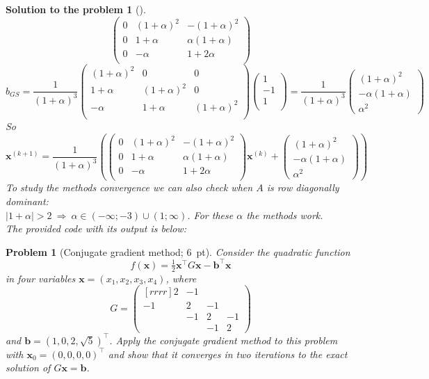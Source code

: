 \documentclass[12pt,a4]{article}
\newtheorem{problem}{Problem}
\newtheorem{solution}{Solution to the problem}
\newcommand{\bb}{{\mathbf b}}
\newcommand{\bx}{{\mathbf x}}
\begin{document}
\begin{solution}[]
\[\begin{pmatrix}
0 & (1+\alpha)^2 & -(1+\alpha)^2\\
0 & 1+\alpha & \alpha(1+\alpha)\\
0 & -\alpha & 1+2\alpha\\
\end{pmatrix}
\]
\[
b_{GS}
= \frac{1}{(1+\alpha)^3}
\begin{pmatrix}
(1+\alpha)^2 & 0 & 0\\
1+\alpha     & (1+\alpha)^2 & 0\\
-\alpha      & 1+\alpha & (1+\alpha)^2\\
\end{pmatrix}
\begin{pmatrix} 1 \\ -1\\ 1 \\ \end{pmatrix}
=
\frac{1}{(1+\alpha)^3}
\begin{pmatrix} (1+\alpha)^2 \\ -\alpha(1+\alpha)\\ \alpha^2 \end{pmatrix}
\]
So
\[
\bx^{(k+1)}=\frac{1}{(1+\alpha)^3}\left(
\begin{pmatrix}
0 & (1+\alpha)^2 & -(1+\alpha)^2\\
0 & 1+\alpha & \alpha(1+\alpha)\\
0 & -\alpha & 1+2\alpha\\
\end{pmatrix}\bx^{(k)}+\begin{pmatrix} (1+\alpha)^2 \\ -\alpha(1+\alpha)\\ \alpha^2 \end{pmatrix}\right)
\]
To study the methods convergence we can also check when $A$ is row diagonally dominant:\\
$|1+\alpha|>2 ~\Rightarrow~ \alpha \in (-\infty;-3) \cup (1;\infty)$. For these $\alpha$ the methods work.\\
The provided code with its output is below:

\end{solution}


\begin{problem}[Conjugate gradient method; 6~pt]\rm %
	Consider the quadratic function \[f(\bx) = \tfrac12\bx^\top G\bx - \bb^\top\bx\]
	in four variables $\bx = (x_1,x_2,x_3,x_4)$, where
	\[
	G= \begin{pmatrix}[rrrr]
	2 & -1 && \\ -1 & 2 & -1 & \\ &-1&2&-1\\&&-1&2
	\end{pmatrix}
	\]
	and $\bb = (1,0,2,\sqrt{5})^\top $. Apply the conjugate gradient method to this problem with $\bx_0=(0,0,0,0)^\top$ and show that it converges in two iterations to the exact solution of $G\bx = \bb$.
\end{problem}
\end{document}
